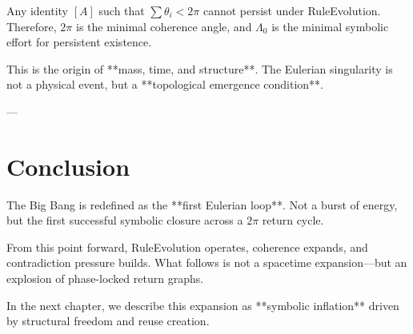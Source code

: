 \begin{theorem}
Any identity $[A]$ such that $\sum \theta_i < 2\pi$ cannot persist under RuleEvolution. Therefore, $2\pi$ is the minimal coherence angle, and $\Lambda_0$ is the minimal symbolic effort for persistent existence.
\end{theorem}

This is the origin of **mass, time, and structure**. The Eulerian singularity is not a physical event, but a **topological emergence condition**.

---

\section{Conclusion}

The Big Bang is redefined as the **first Eulerian loop**. Not a burst of energy, but the first successful symbolic closure across a $2\pi$ return cycle.

From this point forward, RuleEvolution operates, coherence expands, and contradiction pressure builds. What follows is not a spacetime expansion—but an explosion of phase-locked return graphs.

In the next chapter, we describe this expansion as **symbolic inflation** driven by structural freedom and reuse creation.
